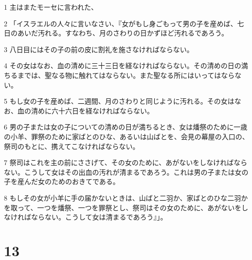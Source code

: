 \par 1 主はまたモーセに言われた、
\par 2 「イスラエルの人々に言いなさい、『女がもし身ごもって男の子を産めば、七日のあいだ汚れる。すなわち、月のさわりの日かずほど汚れるであろう。
\par 3 八日目にはその子の前の皮に割礼を施さなければならない。
\par 4 その女はなお、血の清めに三十三日を経なければならない。その清めの日の満ちるまでは、聖なる物に触れてはならない。また聖なる所にはいってはならない。
\par 5 もし女の子を産めば、二週間、月のさわりと同じように汚れる。その女はなお、血の清めに六十六日を経なければならない。
\par 6 男の子または女の子についての清めの日が満ちるとき、女は燔祭のために一歳の小羊、罪祭のために家ばとのひな、あるいは山ばとを、会見の幕屋の入口の、祭司のもとに、携えてこなければならない。
\par 7 祭司はこれを主の前にささげて、その女のために、あがないをしなければならない。こうして女はその出血の汚れが清まるであろう。これは男の子または女の子を産んだ女のためのおきてである。
\par 8 もしその女が小羊に手の届かないときは、山ばと二羽か、家ばとのひな二羽かを取って、一つを燔祭、一つを罪祭とし、祭司はその女のために、あがないをしなければならない。こうして女は清まるであろう』」。

\chapter{13}

